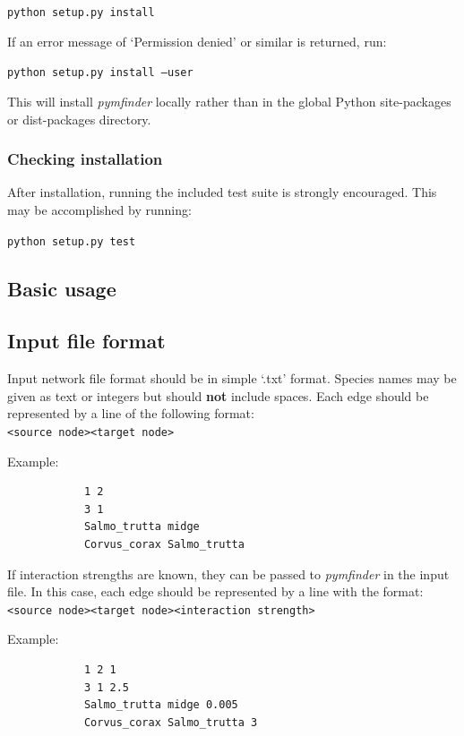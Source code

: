 \documentclass[12pt]{article}
\newcommand\tab[1][1cm]{\hspace*{#1}}
\begin{document}
			\tab\texttt{python setup.py install}

			If an error message of `Permission denied' or similar is returned, run:

			\tab\texttt{python setup.py install --user}

			This will install \emph{pymfinder} locally rather than in the global Python site-packages or dist-packages directory. 

		\subsubsection{Checking installation}
			After installation, running the included test suite is strongly encouraged. This may be accomplished by running:

			\tab\texttt{python setup.py test}

	\subsection{Basic usage}
		\subsection{Input file format}
			Input network file format should be in simple `.txt' format. Species names may be given as text or integers but should \textbf{not} include spaces. Each edge should be represented by a line of the following format:\\
			\texttt{\textless source node\textgreater  \textless target node\textgreater}

			Example:
			\begin{lstlisting}
			1 2
			3 1
			Salmo_trutta midge
			Corvus_corax Salmo_trutta
			\end{lstlisting}

			If interaction strengths are known, they can be passed to \emph{pymfinder} in the input file. In this case, each edge should be represented by a line with the format:\\
			\texttt{\textless source node\textgreater \textless target node\textgreater \textless interaction strength\textgreater}

			Example:
			\begin{lstlisting}
			1 2 1
			3 1 2.5
			Salmo_trutta midge 0.005
			Corvus_corax Salmo_trutta 3
			\end{lstlisting}
\end{document}
